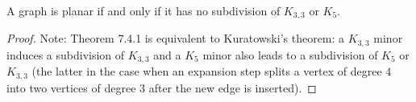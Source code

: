\begin{theorem}[Kuratowski]
  \label{thm:Kuratowski}
  A graph is planar if and only if it has no subdivision of $K_{3,3}$ or $K_{5}$.
\end{theorem}

\begin{proof}
  Note: Theorem 7.4.1 is equivalent to Kuratowski's theorem: a $K_{3,3}$ minor induces a subdivision of $K_{3,3}$ and a $K_{5}$ minor also leads to a subdivision of $K_{5}$ or $K_{3,3}$ (the latter in the case when an expansion step splits a vertex of degree $4$ into two vertices of degree $3$ after the new edge is inserted).
\end{proof}
